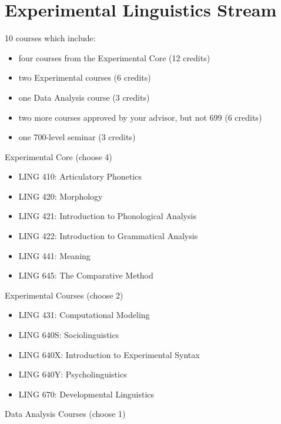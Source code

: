 \documentclass[
]{book}
\providecommand{\tightlist}{%
  \setlength{\itemsep}{0pt}\setlength{\parskip}{0pt}}
\begin{document}
\section{Experimental Linguistics Stream}\label{experimental-linguistics-stream}

10 courses which include:

\begin{itemize}
\tightlist
\item
  four courses from the Experimental Core (12 credits)
\item
  two Experimental courses (6 credits)
\item
  one Data Analysis course (3 credits)
\item
  two more courses approved by your advisor, but not 699 (6 credits)
\item
  one 700-level seminar (3 credits)
\end{itemize}

Experimental Core (choose 4)

\begin{itemize}
\tightlist
\item
  LING 410: Articulatory Phonetics
\item
  LING 420: Morphology
\item
  LING 421: Introduction to Phonological Analysis
\item
  LING 422: Introduction to Grammatical Analysis
\item
  LING 441: Meaning
\item
  LING 645: The Comparative Method
\end{itemize}

Experimental Courses (choose 2)

\begin{itemize}
\tightlist
\item
  LING 431: Computational Modeling
\item
  LING 640S: Sociolinguistics
\item
  LING 640X: Introduction to Experimental Syntax
\item
  LING 640Y: Psycholinguistics
\item
  LING 670: Developmental Linguistics
\end{itemize}

Data Analysis Courses (choose 1)
\end{document}
